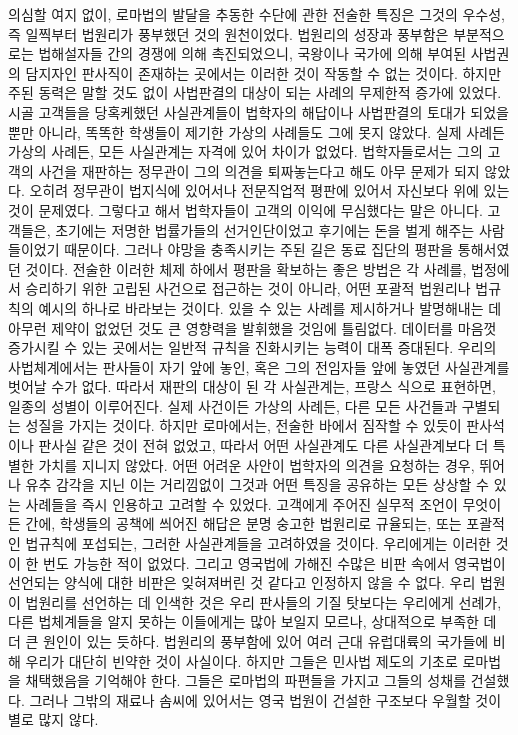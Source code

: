 의심할 여지 없이,
로마법의 발달을 추동한 수단에 관한 전술한 특징은
그것의 우수성, 즉 일찍부터 법원리가 풍부했던 것의 원천이었다.
법원리의 성장과 풍부함은 부분적으로는 법해설자들 간의 경쟁에 의해
촉진되었으니, 국왕이나 국가에 의해 부여된 사법권의 담지자인
판사직이 존재하는 곳에서는 이러한 것이 작동할 수 없는 것이다.
하지만 주된 동력은 말할 것도 없이 사법판결의 대상이 되는 사례의
무제한적 증가에 있었다.
시골 고객들을 당혹케했던 사실관계들이 법학자의 해답이나 사법판결의
토대가 되었을 뿐만 아니라, 똑똑한 학생들이 제기한 가상의 사례들도
그에 못지 않았다.
실제 사례든 가상의 사례든, 모든 사실관계는 자격에 있어 차이가 없었다.
법학자들로서는 그의 고객의 사건을 재판하는 정무관이 그의 의견을
퇴짜놓는다고 해도 아무 문제가 되지 않았다.
오히려 정무관이 법지식에 있어서나 전문직업적 평판에 있어서 자신보다
위에 있는 것이 문제였다.
그렇다고 해서 법학자들이 고객의 이익에 무심했다는 말은 아니다.
고객들은, 초기에는 저명한 법률가들의 선거인단이었고
후기에는 돈을 벌게 해주는 사람들이었기 때문이다.
그러나 야망을 충족시키는 주된 길은 동료 집단의 평판을 통해서였던 것이다.
전술한 이러한 체제 하에서 평판을 확보하는 좋은 방법은 각 사례를,
법정에서 승리하기 위한 고립된 사건으로 접근하는 것이 아니라,
어떤 포괄적 법원리나 법규칙의 예시의 하나로 바라보는 것이다.
있을 수 있는 사례를 제시하거나 발명해내는 데 아무런 제약이 없었던 것도
큰 영향력을 발휘했을 것임에 틀림없다.
데이터를 마음껏 증가시킬 수 있는 곳에서는
일반적 규칙을 진화시키는 능력이 대폭 증대된다.
우리의 사법체계에서는 판사들이 자기 앞에 놓인,
혹은 그의 전임자들 앞에 놓였던 사실관계를 벗어날 수가 없다.
따라서 재판의 대상이 된 각 사실관계는,
프랑스 식으로 표현하면, 일종의 성별이 이루어진다.
실제 사건이든 가상의 사례든, 다른 모든 사건들과 구별되는 성질을 가지는 것이다.
하지만 로마에서는, 전술한 바에서 짐작할 수 있듯이
판사석이나 판사실
같은 것이 전혀 없었고,
따라서 어떤 사실관계도 다른 사실관계보다 더 특별한 가치를 지니지 않았다.
어떤 어려운 사안이 법학자의 의견을 요청하는 경우,
뛰어나 유추 감각을 지닌 이는 거리낌없이 그것과 어떤 특징을 공유하는
모든 상상할 수 있는 사례들을 즉시 인용하고 고려할 수 있었다.
고객에게 주어진 실무적 조언이 무엇이든 간에,
학생들의 공책에 씌어진 해답은 분명
숭고한 법원리로 규율되는, 또는 포괄적인 법규칙에 포섭되는,
그러한 사실관계들을 고려하였을 것이다.
우리에게는 이러한 것이 한 번도 가능한 적이 없었다.
그리고 영국법에 가해진 수많은 비판 속에서
영국법이 선언되는 양식에 대한 비판은 잊혀져버린 것 같다고 인정하지 않을 수 없다.
우리 법원이 법원리를 선언하는 데 인색한 것은
우리 판사들의 기질 탓보다는
우리에게 선례가,
다른 법체계들을 알지 못하는 이들에게는 많아 보일지 모르나,
상대적으로 부족한 데 더 큰 원인이 있는 듯하다.
법원리의 풍부함에 있어 여러 근대 유럽대륙의 국가들에 비해
우리가 대단히 빈약한 것이 사실이다.
하지만 그들은 민사법 제도의 기초로 로마법을 채택했음을 기억해야 한다.
그들은 로마법의 파편들을 가지고 그들의 성채를 건설했다.
그러나 그밖의 재료나 솜씨에 있어서는 영국 법원이 건설한 구조보다
우월할 것이 별로 많지 않다.

